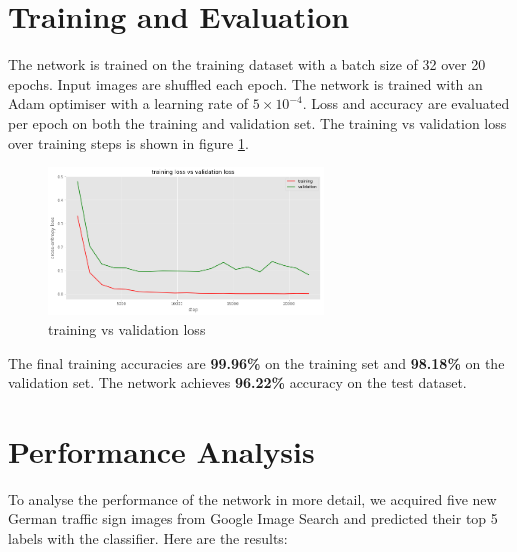 \documentclass[]{article}
\begin{document}
\section{Training and Evaluation}

The network is trained on the training dataset with a batch size of 32 over 20 epochs. Input images are shuffled each epoch. The network is trained with an Adam optimiser with a learning rate of $5 \times 10^{-4}$. Loss and accuracy are evaluated per epoch on both the training and validation set. The training vs validation loss over training steps is shown in figure \ref{fig:loss}.

\begin{figure}[H]
	\centering
	\includegraphics[width=0.65\textwidth]{loss}
	\caption{training vs validation loss}
	\label{fig:loss}
\end{figure}

The final training accuracies are \textbf{99.96\%} on the training set and \textbf{98.18\%} on the validation set.
The network achieves \textbf{96.22\%} accuracy on the test dataset.

\section{Performance Analysis}

To analyse the performance of the network in more detail, we acquired five new German traffic sign images from Google Image Search and predicted their top 5 labels with the classifier. Here are the results:
\end{document}
